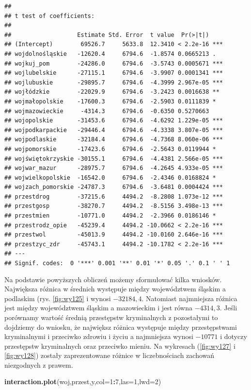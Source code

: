 \documentclass[polish,]{book}
\newenvironment{Shaded}{\begin{snugshade}}{\end{snugshade}}
\newcommand{\DataTypeTok}[1]{\textcolor[rgb]{0.13,0.29,0.53}{#1}}
\newcommand{\DecValTok}[1]{\textcolor[rgb]{0.00,0.00,0.81}{#1}}
\newcommand{\KeywordTok}[1]{\textcolor[rgb]{0.13,0.29,0.53}{\textbf{#1}}}
\newcommand{\NormalTok}[1]{#1}
\newcommand{\OperatorTok}[1]{\textcolor[rgb]{0.81,0.36,0.00}{\textbf{#1}}}
\begin{document}
\begin{verbatim}
## 
## t test of coefficients:
## 
##                   Estimate Std. Error  t value  Pr(>|t|)    
## (Intercept)        69526.7     5633.8  12.3410 < 2.2e-16 ***
## wojdolnośląskie   -12620.4     6794.6  -1.8574 0.0665213 .  
## wojkuj_pom        -24286.0     6794.6  -3.5743 0.0005671 ***
## wojlubelskie      -27115.1     6794.6  -3.9907 0.0001341 ***
## wojlubuskie       -29895.7     6794.6  -4.3999 2.967e-05 ***
## wojłódzkie        -22029.9     6794.6  -3.2423 0.0016638 ** 
## wojmałopolskie    -17600.3     6794.6  -2.5903 0.0111839 *  
## wojmazowieckie     -4314.3     6794.6  -0.6350 0.5270663    
## wojopolskie       -31453.6     6794.6  -4.6292 1.229e-05 ***
## wojpodkarpackie   -29446.4     6794.6  -4.3338 3.807e-05 ***
## wojpodlaskie      -32184.4     6794.6  -4.7368 8.060e-06 ***
## wojpomorskie      -17423.6     6794.6  -2.5643 0.0119944 *  
## wojświętokrzyskie -30155.1     6794.6  -4.4381 2.566e-05 ***
## wojwar_mazur      -28975.7     6794.6  -4.2645 4.933e-05 ***
## wojwielkopolskie  -16542.0     6794.6  -2.4346 0.0168824 *  
## wojzach_pomorskie -24787.3     6794.6  -3.6481 0.0004424 ***
## przestdrog        -37215.6     4494.2  -8.2808 1.073e-12 ***
## przestgosp        -38270.7     4494.2  -8.5156 3.498e-13 ***
## przestmien        -10771.0     4494.2  -2.3966 0.0186146 *  
## przestrodz_opie   -45239.4     4494.2 -10.0662 < 2.2e-16 ***
## przestwol         -45013.9     4494.2 -10.0160 2.646e-16 ***
## przestzyc_zdr     -45743.1     4494.2 -10.1782 < 2.2e-16 ***
## ---
## Signif. codes:  0 '***' 0.001 '**' 0.01 '*' 0.05 '.' 0.1 ' ' 1
\end{verbatim}

Na podstawie powyższych obliczeń możemy sformułować kilka wniosków. Największa
różnica w średnich występuje między województwem śląskim a podlaskim (rys. \ref{fig:wy125} i wynosi \(-32184,4\). Natomiast najmniejsza różnica jest między województwem
śląskim a mazowieckim i jest równa \(-4314,3\). Jeśli porównamy wartość średnią przestępstw kryminalnych z pozostałymi to dojdziemy do wniosku, że największ różnica
występuje między przestępstwami kryminalnymi i przeciwko zdrowiu i życiu a najmniejsza wynosi \(-10771\) i dotyczy przestępstw kryminalnych oraz przeciwko mieniu.
Na wykresach (\ref{fig:wy127} i \ref{fig:wy128}) zostały zaprezentowane różnice w liczebnościach zachowań niezgodnych z prawem.

\begin{Shaded}
\begin{Highlighting}[]
\KeywordTok{interaction.plot}\NormalTok{(woj,przest,y,}\DataTypeTok{col=}\DecValTok{1}\OperatorTok{:}\DecValTok{7}\NormalTok{,}\DataTypeTok{las=}\DecValTok{1}\NormalTok{,}\DataTypeTok{lwd=}\DecValTok{2}\NormalTok{)}
\end{Highlighting}
\end{Shaded}
\end{document}
